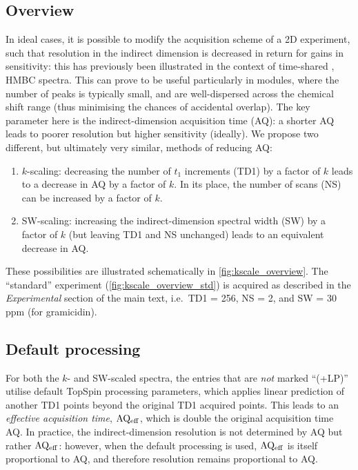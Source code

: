 \subsection{Overview}

In ideal cases, it is possible to modify the acquisition scheme of a 2D experiment, such that resolution in the indirect dimension is decreased in return for gains in sensitivity: this has previously been illustrated in the context of time-shared \nitrogen{},\carbon{} HMBC spectra.\autocite{Perez-Trujillo2007MRC,Parella2010CMR}
This can prove to be useful particularly in \nitrogen{} modules, where the number of peaks is typically small, and are well-dispersed across the chemical shift range (thus minimising the chances of accidental overlap).
The key parameter here is the indirect-dimension acquisition time (AQ): a shorter AQ leads to poorer resolution but higher sensitivity (ideally).
We propose two different, but ultimately very similar, methods of reducing AQ:

\begin{enumerate}
    \item $k$-scaling: decreasing the number of $t_1$ increments (TD1) by a factor of $k$ leads to a decrease in AQ by a factor of $k$. In its place, the number of scans (NS) can be increased by a factor of $k$.
    \item SW-scaling: increasing the indirect-dimension spectral width (SW) by a factor of $k$ (but leaving TD1 and NS unchanged) leads to an equivalent decrease in AQ.
\end{enumerate}

These possibilities are illustrated schematically in \cref{fig:kscale_overview}.
The ``standard'' experiment (\cref{fig:kscale_overview_std}) is acquired as described in the \textit{Experimental} section of the main text, i.e.\ TD1 = 256, NS = 2, and SW = 30 ppm (for gramicidin).

\subsection{Default processing}

For both the $k$- and SW-scaled spectra, the entries that are \textit{not} marked ``(+LP)'' utilise default TopSpin processing parameters, which applies linear prediction of another TD1 points beyond the original TD1 acquired points.
This leads to an \textit{effective acquisition time}, $\mathrm{AQ_{eff}}$, which is double the original acquisition time AQ.
In practice, the indirect-dimension resolution is not determined by AQ but rather $\mathrm{AQ_{eff}}$: however, when the default processing is used, $\mathrm{AQ_{eff}}$ is itself proportional to AQ, and therefore resolution remains proportional to AQ.

